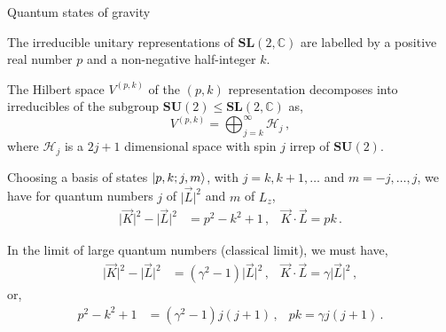 \documentclass{beamer}
\begin{document}
\begin{frame}{Quantum states of gravity}
    \begin{list}{\maltese}{\leftmargin=1em \itemindent=0em}
        \item<1-> The irreducible unitary representations of $\mathbf{SL}(2,\mathbb{C})$ are labelled by a positive real number $p$ and a non-negative half-integer $k$.
        \item<2-> The Hilbert space $V^{(p,k)}$ of the $(p,k)$ representation decomposes into irreducibles of the subgroup $\mathbf{SU}(2)\leq\mathbf{SL}(2,\mathbb{C})$ as,
        \begin{equation}
            V^{(p,k)}=\bigoplus^\infty_{j=k}\mathcal{H}_j\,,
        \end{equation}
        where $\mathcal{H}_j$ is a $2j+1$ dimensional space with spin $j$ irrep of $\mathbf{SU}(2)$.
        \item<3-> Choosing a basis of states $\ket{p,k;j,m}$, with $j=k,k+1,\dots$ and $m=-j,\dots,j$, we have for quantum numbers $j$ of $\lvert\vec{L}\rvert^2$ and $m$ of $L_z$,
        \begin{align}
            \lvert\vec{K}\rvert^2-\lvert\vec{L}\rvert^2 &= p^2-k^2+1\,, &\vec{K}\cdot\vec{L}=pk\,.
        \end{align}
        \item<4-> In the limit of large quantum numbers (classical limit), we must have,
        \begin{align}
            \lvert\vec{K}\rvert^2-\lvert\vec{L}\rvert^2 &= (\gamma^2-1) \lvert\vec{L}\rvert^2 \,, &\vec{K}\cdot\vec{L}=\gamma \lvert\vec{L}\rvert^2\,,
        \end{align}
        or,
        \begin{align}
            p^2-k^2+1 &=(\gamma^2-1)j(j+1)\,, &pk=\gamma j(j+1)\,.
        \end{align}
    \end{list}
\end{frame}
\end{document}
